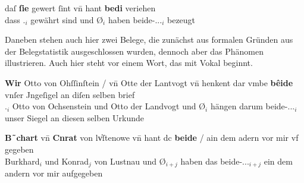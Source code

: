 \begin{exe}
\begin{xlist}
	\ex \label{ex:vvfinctrl_4}
		\gll daſ \textbf{ſie} gewert ſint \textelp{} vn̄ {} hant
				\textbf{bedi} veriehen \\				
			dass \Tpl\subMF.\Nom{}$_i$ gewährt sind {} und Ø$_i$ haben
				beide-\Nom.\Pl.\NeutMF.\St{}$_i$ bezeugt \\
		\begin{taggedline}{\parencites(Straßburg, 1281)[N~202, 156.16]{cao5}}
		\trans {}
		\end{taggedline}
	\end{xlist}
\end{exe}

Daneben stehen auch hier zwei Belege, die zunächst aus formalen Gründen aus der
Beleg\-statistik ausgeschlossen wurden, dennoch aber das Phänomen illustrieren.
Auch hier steht  vor einem Wort, das mit Vokal beginnt.

\begin{exe}
\ex \label{ex:vvfinctrl2}
	\begin{xlist}
	\ex \label{ex:vvfinctrl2_1}
		\gll \textbf{Wir} Otto von Ohſſinſtein / vn̄ Otte der Lantvogt
				\textelp{} vn̄ {} henkent {dar vmbe} \textbf{bêide} vnſer
				Jngeſigel an diſen selben brief \\
			\Tpl\subM.\Nom{}$_i$ Otto von Ochsenstein {} und Otto der Landvogt
				{} und Ø$_i$ hängen darum beide-\Nom.\Pl.\MascM.\St{}$_i$ unser
				Siegel an diesen selben Urkunde \\
		\begin{taggedline}{\parencites(Burg Ochsenstein, Dépt.~Bas-Rhin, 1289)[\pno~1145, 427.5--6]{cao2}}
		\trans {}
		\end{taggedline}

	\ex \label{ex:vvfinctrl2_2}
		\gll \textbf{B˜chart} vn̄ \textbf{Cnrat} von lv̓ſtenowe
				\textelp{} vn̄ {} hant dc \textbf{beide} / ain dem
				adern vor mir {vf gegeben} \\				
			Burkhard$_i$ und Konrad$_j$ von Lustnau {} und Ø$_{i+j}$ haben das
				beide-\Nom.\Pl.\MascM.\St{}$_{i+j}$ {} ein dem andern vor mir
				aufgegeben \\
		\begin{taggedline}{\parencites(Tübingen, 1297)[\pno~2607, 32.41--33.1]{cao4}}
		\trans {}
		\end{taggedline}
	\end{xlist}
\end{exe}

